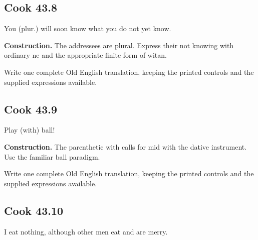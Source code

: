 \par\begin{minipage}{\linewidth}\raggedright
\subsection*{Cook 43.8}

You (plur.) will soon know what you do not yet know.

\textbf{Construction.} The addressees are plural. Express their not knowing with ordinary ne and the appropriate finite form of witan.

Write one complete Old English translation, keeping the printed controls and the supplied expressions available.

\end{minipage}\par\addvspace{4pt}

\par\begin{minipage}{\linewidth}\raggedright
\subsection*{Cook 43.9}

Play (with) ball!

\textbf{Construction.} The parenthetic with calls for mid with the dative instrument. Use the familiar ball paradigm.

Write one complete Old English translation, keeping the printed controls and the supplied expressions available.

\end{minipage}\par\addvspace{4pt}

\par\begin{minipage}{\linewidth}\raggedright
\subsection*{Cook 43.10}

I eat nothing, although other men eat and are merry.

\end{minipage}\par\addvspace{4pt}

